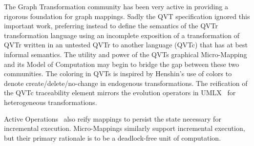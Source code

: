 \documentclass[conference]{IEEEtran}
\begin{document}
The Graph Transformation community has been very active in providing a rigorous foundation for graph mappings. Sadly the QVT specification ignored this important work, preferring instead to define the semantics of the QVTr transformation language using an incomplete exposition of a transformation of QVTr written in an untested QVTr to another language (QVTc) that has at best informal semantics. The utility and power of the QVTs graphical Micro-Mapping and its Model of Computation may begin to bridge the gap between these two communities. The coloring in QVTs is inspired by Henshin's \cite{Henshin} use of colors to denote create/delete/no-change in endogenous transformations. The reification of the QVTc traceability element mirrors the evolution operators in UMLX~\cite{UMLX} for heterogeneous transformations.

Active Operations~\cite{Jouault-ActiveOperations} also reify mappings 
to persist the state necessary for incremental execution. Micro-Mappings similarly support incremental execution, but their primary rationale is to be a deadlock-free unit of computation.

%
%

\end{document}
